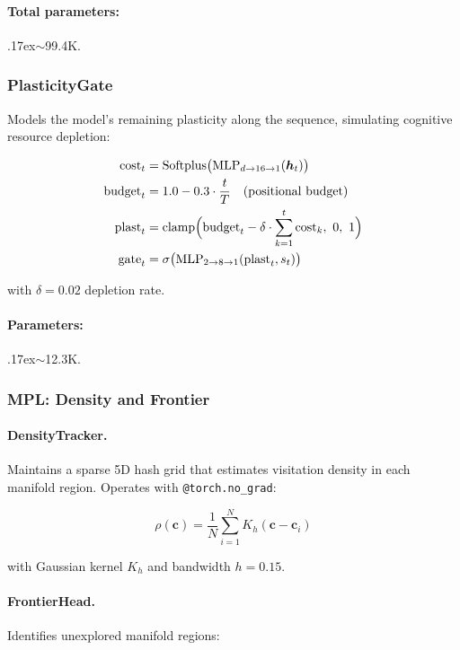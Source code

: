 \paragraph{Total parameters:} {\raise.17ex\hbox{$\scriptstyle\sim$}}99.4K.

\subsubsection{PlasticityGate}
\label{sec:plasticity}

Models the model's remaining plasticity along the sequence, simulating
cognitive resource depletion:

\begin{align}
    \text{cost}_t &= \text{Softplus}\big(\text{MLP}_{d \to 16 \to 1}(\bm{h}_t)\big) \\
    \text{budget}_t &= 1.0 - 0.3 \cdot \frac{t}{T} \quad \text{(positional budget)} \\
    \text{plast}_t &= \text{clamp}\Big(\text{budget}_t - \delta \cdot \sum_{k=1}^{t} \text{cost}_k, \ 0, \ 1\Big) \\
    \text{gate}_t &= \sigma\big(\text{MLP}_{2 \to 8 \to 1}(\text{plast}_t, s_t)\big)
\end{align}

with $\delta = 0.02$ depletion rate.

\paragraph{Parameters:} {\raise.17ex\hbox{$\scriptstyle\sim$}}12.3K.

\subsubsection{MPL: Density and Frontier}
\label{sec:mpl}

\paragraph{DensityTracker.}
Maintains a sparse 5D hash grid that estimates visitation density in
each manifold region. Operates with \texttt{@torch.no\_grad}:

\begin{equation}
    \rho(\bm{c}) = \frac{1}{N} \sum_{i=1}^{N} K_h(\bm{c} - \bm{c}_i)
\end{equation}

with Gaussian kernel $K_h$ and bandwidth $h = 0.15$.

\paragraph{FrontierHead.}
Identifies unexplored manifold regions:

